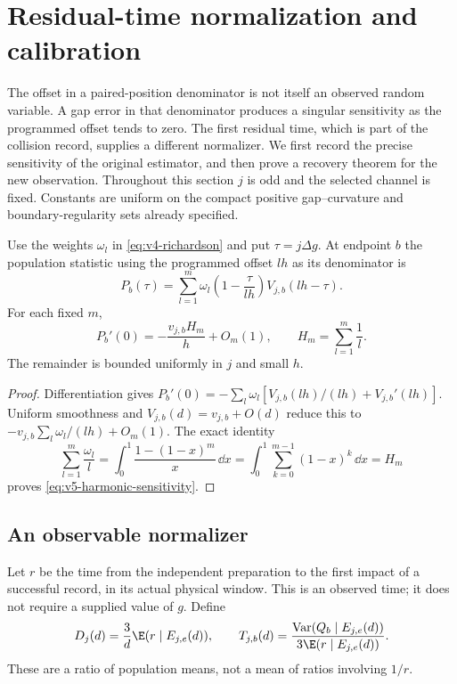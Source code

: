 \section{Residual-time normalization and calibration}
\label{sec:v5-residual}
The offset in a paired-position denominator is not itself an observed
random variable. A gap error in that denominator produces a singular
sensitivity as the programmed offset tends to zero. The first residual
time, which is part of the collision record, supplies a different
normalizer. We first record the precise sensitivity of the original
estimator, and then prove a recovery theorem for the new observation.
Throughout this section $j$ is odd and the selected channel is fixed.
Constants are uniform on the compact positive gap--curvature and
boundary-regularity sets already specified.

\begin{proposition}
\label{prop:v5-harmonic}
Use the weights $\omega_l$ in \eqref{eq:v4-richardson} and put
$\tau=j\Delta g$. At endpoint $b$ the population statistic using the
programmed offset $lh$ as its denominator is
\[
 P_b(\tau)=\sum_{l=1}^m\omega_l
       \left(1-\frac{\tau}{lh}\right)V_{j,b}(lh-\tau).
\]
For each fixed $m$,
\begin{equation}\label{eq:v5-harmonic-sensitivity}
 P_b'(0)=-\frac{v_{j,b}H_m}{h}+O_m(1),\qquad
 H_m=\sum_{l=1}^m\frac1l.
\end{equation}
The remainder is bounded uniformly in $j$ and small $h$.
\end{proposition}
\begin{proof}
Differentiation gives
$P_b'(0)=-\sum_l\omega_l[V_{j,b}(lh)/(lh)+V_{j,b}'(lh)]$.
Uniform smoothness and $V_{j,b}(d)=v_{j,b}+O(d)$ reduce this to
$-v_{j,b}\sum_l\omega_l/(lh)+O_m(1)$.
The exact identity
\[
 \sum_{l=1}^m\frac{\omega_l}{l}
 =\int_0^1\frac{1-(1-x)^m}{x}\,\dd x
 =\int_0^1\sum_{k=0}^{m-1}(1-x)^k\,\dd x=H_m
\]
proves \eqref{eq:v5-harmonic-sensitivity}.
\end{proof}

\subsection{An observable normalizer}
Let $r$ be the time from the independent preparation to the first
impact of a successful record, in its actual physical window. This is
an observed time; it does not require a supplied value of $g$.
Define
\begin{equation}\label{eq:v5-residual-normalizer}
 D_j(d)=\frac{3}{d}\E(r\mid E_{j,e}(d)),\qquad
 T_{j,b}(d)=\frac{\operatorname{Var}(Q_b\mid E_{j,e}(d))}
                         {3\E(r\mid E_{j,e}(d))}.
\end{equation}
These are a ratio of population means, not a mean of ratios involving
$1/r$.

